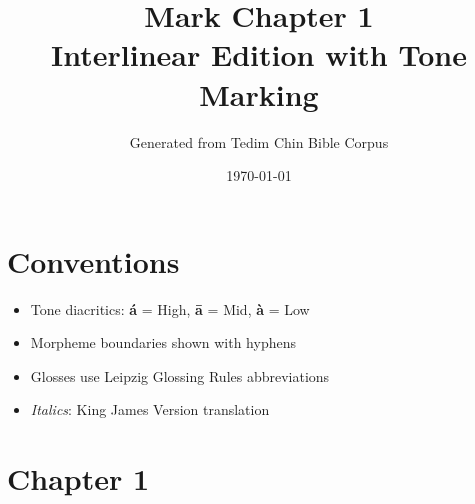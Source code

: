 \documentclass[11pt,a4paper]{article}
\title{Mark Chapter 1 \\ \large Interlinear Edition with Tone Marking}
\author{Generated from Tedim Chin Bible Corpus}
\date{\today}
\begin{document}
\maketitle

\section*{Conventions}
\begin{itemize}
\item Tone diacritics: \textbf{á} = High, \textbf{ā} = Mid, \textbf{à} = Low
\item Morpheme boundaries shown with hyphens
\item Glosses use Leipzig Glossing Rules abbreviations
\item \textcolor{kjvcolor}{\textit{Italics}}: King James Version translation
\end{itemize}

\tableofcontents
\newpage

\section*{Chapter 1}
\end{document}
